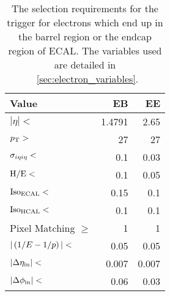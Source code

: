 \begin{table}[h]
    \centering
    \begin{center}
        \begin{tabular}{@{}l r r@{}}
            \toprule
            Value                      & EB     & EE     \\
            \midrule
            $|\eta| <$                 & 1.4791 & 2.65   \\
            $p_{\mathrm{T}} >$                    & 27     & 27     \\
            $\sigma_{i \eta i \eta} <$         & 0.1    & 0.03   \\
            $\text{H}/\text{E} <$                & 0.1    & 0.05   \\
            $\text{Iso}_{\text{ECAL}} <$               & 0.15   & 0.1    \\
            $\text{Iso}_{\text{HCAL}} <$               & 0.1    & 0.1    \\
            Pixel Matching $\ge$       & 1      & 1      \\
            $|\left( 1/E - 1/p \right)| <$              & 0.05   & 0.05   \\
            $|\Delta \eta_{\text{in}}| <$              & 0.007  & 0.007  \\
            $|\Delta \phi_{\text{in}}| <$              & 0.06   & 0.03   \\
            \bottomrule
        \end{tabular}
    \end{center}
    \caption[
        The selection requirements for the \SingleElectronTrigger trigger.
    ]{
        The selection requirements for the \SingleElectronTrigger trigger for
        electrons which end up in the barrel region or the endcap region of ECAL.
        The variables used are detailed in \SEC~\ref{sec:electron_variables}.
    }
    \label{table:wp80}
\end{table}
